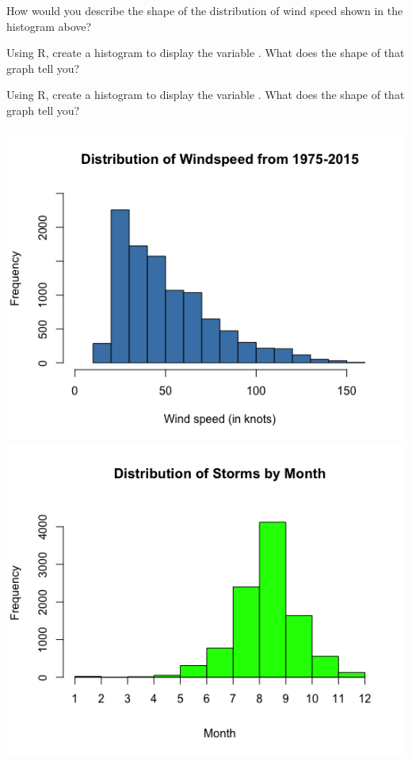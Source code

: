 \bb[resume]
\ii How would you describe the shape of the distribution of wind speed shown in the histogram above? \vfill

\ii Using R, create a histogram to display the variable \textbf{}. What does the shape of that graph tell you?  \vfill

\ii Using R, create a histogram to display the variable \textbf{}. What does the shape of that graph tell you?  \vfill

\ee

\clearpage


\bbox
\begin{center}
\includegraphics[width=0.3\tw]{02/fig-windspeed-hist.png}
\includegraphics[width=0.3\tw]{02/fig-month-hist.png}

\end{center}
